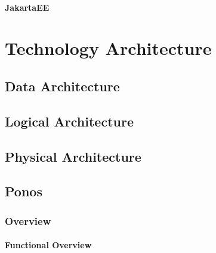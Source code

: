 \documentclass[a4paper]{book}
\begin{document}
\subsection{JakartaEE\texttrademark}

\part{Technology Architecture}
\chapter{Data Architecture}

\chapter{Logical Architecture}

\chapter{Physical Architecture}

\appendix

\chapter{Ponos}
\section{Overview}
\subsection{Functional Overview}
\end{document}
